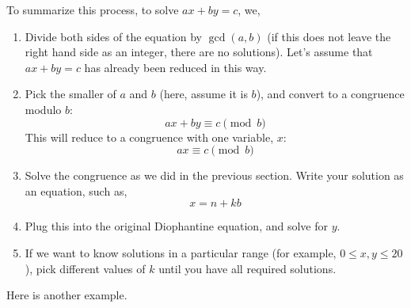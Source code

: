 \documentclass[12pt]{article}
\begin{document}
To summarize this process, to solve $ax + by = c$, we,
\begin{enumerate}
	\item Divide both sides of the equation by $\gcd(a,b)$ (if this does not leave the right hand side as an integer, there are no solutions).  Let's assume that $ax + by = c$ has already been reduced in this way.
	\item Pick the smaller of $a$ and $b$ (here, assume it is $b$), and convert to a congruence modulo $b$:
	\[ax + by \equiv c \pmod{b}\]
	This will reduce to a congruence with one variable, $x$:
	\[ax \equiv c \pmod{b}\]
	\item Solve the congruence as we did in the previous section.  Write your solution as an equation, such as,
	\[x = n + kb\]
	\item Plug this into the original Diophantine equation, and solve for $y$.
	\item If we want to know solutions in a particular range (for example, $0 \le x, y \le 20$), pick different values of $k$ until you have all required solutions.
\end{enumerate}

Here is another example.
\end{document}
